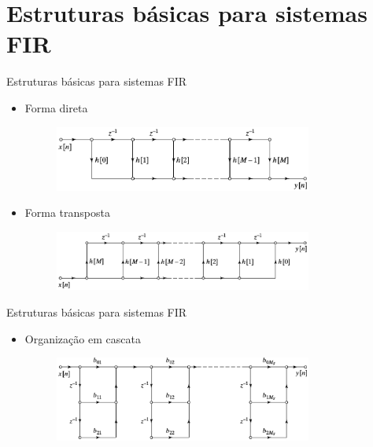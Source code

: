 \section{Estruturas básicas para sistemas FIR}
\begin{slide}{Estruturas básicas para sistemas FIR}
	\begin{itemize}
		\item Forma direta
   			\begin{figure}
       				\centering
        			\includegraphics[width = 0.8\textwidth]{figs/firdirect.eps}
			\end{figure}
		\item Forma transposta
   			\begin{figure}
       				\centering
        			\includegraphics[width = 0.8\textwidth]{figs/firtransposed.eps}
			\end{figure}
	\end{itemize}
\end{slide}

\begin{slide}{Estruturas básicas para sistemas FIR}
	\begin{itemize}
		\item Organização em cascata
   			\begin{figure}
       				\centering
        			\includegraphics[width = 0.8\textwidth]{figs/fircascade.eps}
			\end{figure}
	\end{itemize}
\end{slide}

